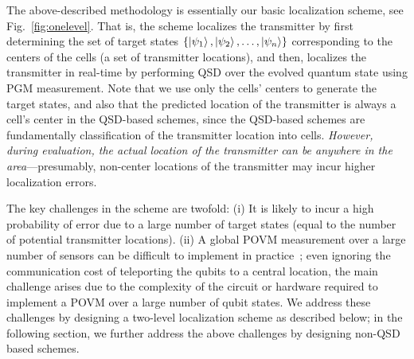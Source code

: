 The above-described methodology is essentially our basic \povmone localization scheme, see Fig.~\ref{fig:onelevel}. 
That is, the \povmone scheme localizes the transmitter by first determining the set 
of target states $\{\ket{\psi_1}, \ket{\psi_2}, \ldots, \ket{\psi_n}\}$ corresponding 
to the centers of the cells (a set of transmitter locations), and then, localizes the 
transmitter
in real-time by performing QSD over the evolved quantum state using PGM measurement.
Note that we use only the cells' centers to generate the target states, and also that
the predicted location
of the transmitter is always a cell's center in the QSD-based schemes, since the QSD-based
schemes are fundamentally classification of the transmitter location into cells.
{\em However, during evaluation, the actual
location of the transmitter can be anywhere in the area}---presumably, non-center locations 
of the transmitter may incur higher localization errors.

The key challenges in the \povmone scheme are twofold: (i) It is likely to incur a high probability
of error due to a large number of target states (equal to the number of potential 
transmitter locations). (ii) A global POVM measurement over a large number of sensors can be
difficult to implement in practice~\cite{pra19-povm}; even ignoring the communication cost of teleporting the 
qubits to a central location, the main challenge arises due to the complexity of the circuit or
hardware required  to implement a POVM over a large number of qubit states.
We address these challenges by designing a two-level localization scheme as described below; 
in the following section, we further address the above challenges by designing non-QSD based
schemes.



